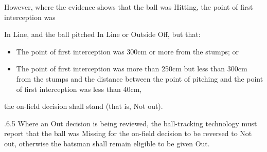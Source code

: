 \documentclass[12pt]{article}
\begin{document}
\vspace{\baselineskip}
\begin{adjustwidth}{1.18in}{0.0in}
{\fontsize{9pt}{10.8pt}\selectfont However, where the evidence shows that the ball was Hitting, the point of first interception was\par}\par

\end{adjustwidth}


\vspace{\baselineskip}
\begin{adjustwidth}{1.18in}{0.0in}
{\fontsize{9pt}{10.8pt}\selectfont In Line, and the ball pitched In Line or Outside Off, but that:\par}\par

\end{adjustwidth}


\vspace{\baselineskip}
\begin{itemize}
	\item {\fontsize{9pt}{10.8pt}\selectfont The point of first interception was 300cm or more from the stumps; or\par}\par


\vspace{\baselineskip}
	\item {\fontsize{9pt}{10.8pt}\selectfont The point of first interception was more than 250cm but less than 300cm from the stumps and the distance between the point of pitching and the point of first interception was less than 40cm,\par}
\end{itemize}\par


\vspace{\baselineskip}
\begin{adjustwidth}{1.18in}{0.0in}
{\fontsize{9pt}{10.8pt}\selectfont the on-field decision shall stand (that is, Not out).\par}\par

\end{adjustwidth}


\vspace{\baselineskip}
\begin{adjustwidth}{1.18in}{0.19in}
{\fontsize{9pt}{10.8pt}.6.5 \tabto{1.17in} Where an Out decision is being reviewed, the ball-tracking technology must report that the ball was Missing for the on-field decision to be reversed to Not out, otherwise the batsman shall remain eligible to be given Out.\par}\par

\end{adjustwidth}
\end{document}
